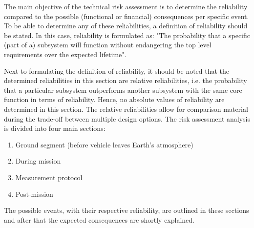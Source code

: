 The main objective of the technical risk assessment is to determine the reliability compared to the possible (functional or financial) consequences per specific event. To be able to determine any of these reliabilities, a definition of reliability should be stated. In this case, reliability is formulated as:
"The probability that a specific (part of a) subsystem will function without endangering the top level requirements over the expected lifetime". 

Next to formulating the definition of reliability, it should be noted that the determined reliabilities in this section are relative reliabilities, i.e. the probability that a particular subsystem outperforms another subsystem with the same core function in terms of reliability. Hence, no absolute values of reliability are determined in this section. The relative reliabilities allow for comparison material during the trade-off between multiple design options. 
The risk assessment analysis is divided into four main sections: 
\begin{enumerate}[I]
	\item Ground segment (before vehicle leaves Earth's atmosphere)
	\item During mission
	\item Measurement protocol
	\item Post-mission
\end{enumerate}
The possible events, with their respective reliability, are outlined in these sections and after that the expected consequences are shortly explained. 

